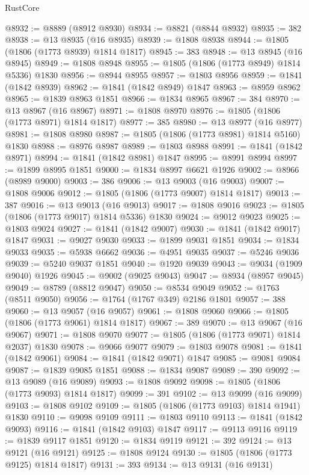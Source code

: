 \begin{lexlean}{RustCore}
\begin{coremodule}
@8932 := @8889 (@8912 @8930)
@8934 := @8821 (@8844 @8932)
@8935 := 382
@8938 := @13 @8935 (@16 @8935)
@8939 := @1808 @8938
@8944 := @1805 (@1806 (@1773 @8939) @1814 @1817)
@8945 := 383
@8948 := @13 @8945 (@16 @8945)
@8949 := @1808 @8948
@8955 := @1805 (@1806 (@1773 @8949) @1814 @5336) @1830
@8956 := @8944 @8955
@8957 := @1803 @8956
@8959 := @1841 (@1842 @8939)
@8962 := @1841 (@1842 @8949) @1847
@8963 := @8959 @8962
@8965 := @1839 @8963 @1851
@8966 := @1834 @8965
@8967 := 384
@8970 := @13 @8967 (@16 @8967)
@8971 := @1808 @8970
@8976 := @1805 (@1806 (@1773 @8971) @1814 @1817)
@8977 := 385
@8980 := @13 @8977 (@16 @8977)
@8981 := @1808 @8980
@8987 := @1805 (@1806 (@1773 @8981) @1814 @5160) @1830
@8988 := @8976 @8987
@8989 := @1803 @8988
@8991 := @1841 (@1842 @8971)
@8994 := @1841 (@1842 @8981) @1847
@8995 := @8991 @8994
@8997 := @1899 @8995 @1851
@9000 := @1834 @8997 @6621 @1926
@9002 := @8966 (@8989 @9000)
@9003 := 386
@9006 := @13 @9003 (@16 @9003)
@9007 := @1808 @9006
@9012 := @1805 (@1806 (@1773 @9007) @1814 @1817)
@9013 := 387
@9016 := @13 @9013 (@16 @9013)
@9017 := @1808 @9016
@9023 := @1805 (@1806 (@1773 @9017) @1814 @5336) @1830
@9024 := @9012 @9023
@9025 := @1803 @9024
@9027 := @1841 (@1842 @9007)
@9030 := @1841 (@1842 @9017) @1847
@9031 := @9027 @9030
@9033 := @1899 @9031 @1851
@9034 := @1834 @9033
@9035 := @5938 @6662
@9036 := @4951 @9035
@9037 := @5246 @9036
@9039 := @5240 @9037 @1851
@9040 := @1920 @9039
@9043 := @9034 (@1909 @9040) @1926
@9045 := @9002 (@9025 @9043)
@9047 := @8934 (@8957 @9045)
@9049 := @8789 (@8812 @9047)
@9050 := @8534 @9049
@9052 := @1763 (@8511 @9050)
@9056 := @1764 (@1767 @349) @2186 @1801
@9057 := 388
@9060 := @13 @9057 (@16 @9057)
@9061 := @1808 @9060
@9066 := @1805 (@1806 (@1773 @9061) @1814 @1817)
@9067 := 389
@9070 := @13 @9067 (@16 @9067)
@9071 := @1808 @9070
@9077 := @1805 (@1806 (@1773 @9071) @1814 @2037) @1830
@9078 := @9066 @9077
@9079 := @1803 @9078
@9081 := @1841 (@1842 @9061)
@9084 := @1841 (@1842 @9071) @1847
@9085 := @9081 @9084
@9087 := @1839 @9085 @1851
@9088 := @1834 @9087
@9089 := 390
@9092 := @13 @9089 (@16 @9089)
@9093 := @1808 @9092
@9098 := @1805 (@1806 (@1773 @9093) @1814 @1817)
@9099 := 391
@9102 := @13 @9099 (@16 @9099)
@9103 := @1808 @9102
@9109 := @1805 (@1806 (@1773 @9103) @1814 @1941) @1830
@9110 := @9098 @9109
@9111 := @1803 @9110
@9113 := @1841 (@1842 @9093)
@9116 := @1841 (@1842 @9103) @1847
@9117 := @9113 @9116
@9119 := @1839 @9117 @1851
@9120 := @1834 @9119
@9121 := 392
@9124 := @13 @9121 (@16 @9121)
@9125 := @1808 @9124
@9130 := @1805 (@1806 (@1773 @9125) @1814 @1817)
@9131 := 393
@9134 := @13 @9131 (@16 @9131)

\end{coremodule}
\end{lexlean}
